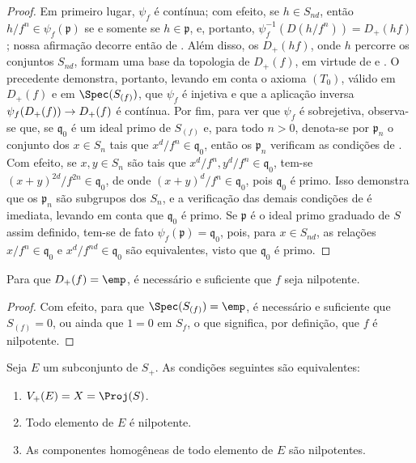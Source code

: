 \documentclass[oneside,10pt]{amsart}
\makeatletter
\newcommand{\ega@arrow}[2]{\mathchoice{#1}{#2}{#2}{#2}}
\renewcommand{\to}{\ega@arrow{\longrightarrow}{\rightarrow}}
\newcommand{\oldpage}[2][]{\marginnote{\normalfont\footnotesize\textbf{#1}~|~#2}\ignorespaces}
\let\EGAOriginalLabel\label
\renewcommand{\label}[1]{\phantomsection\EGAOriginalLabel{#1}}
\makeatother
\begin{document}
\begin{proof}
Em primeiro lugar, $\psi_f$ é contínua; com efeito, se $h\in S_{nd}$, então $h/f^n\in\psi_f(\mathfrak{p})$ se e somente se $h\in\mathfrak{p}$, e, portanto, $\psi_f^{-1}(D(h/f^n))=D_+(hf)$; nossa afirmação decorre então de .
Além disso, os $D_+(hf)$, onde $h$ percorre os conjuntos $S_{nd}$, formam uma base da topologia de $D_+(f)$, em virtude de  e .
O
\oldpage[II]{27}
precedente demonstra, portanto, levando em conta o axioma $(T_0)$, válido em $D_+(f)$ e em $\Spec(S_{(f)})$, que $\psi_f$ é injetiva e que a aplicação inversa $\psi_f(D_+(f))\to D_+(f)$ é contínua.
Por fim, para ver que $\psi_f$ é sobrejetiva, observa-se que, se $\mathfrak{q}_0$ é um ideal primo de $S_{(f)}$ e, para todo $n>0$, denota-se por $\mathfrak{p}_n$ o conjunto dos $x\in S_n$ tais que $x^d/f^n\in\mathfrak{q}_0$, então os $\mathfrak{p}_n$ verificam as condições de .
Com efeito, se $x,y\in S_n$ são tais que $x^d/f^n,y^d/f^n\in\mathfrak{q}_0$, tem-se $(x+y)^{2d}/f^{2n}\in\mathfrak{q}_0$, de onde $(x+y)^d/f^n\in\mathfrak{q}_0$, pois $\mathfrak{q}_0$ é primo.
Isso demonstra que os $\mathfrak{p}_n$ são subgrupos dos $S_n$, e a verificação das demais condições de  é imediata, levando em conta que $\mathfrak{q}_0$ é primo.
Se $\mathfrak{p}$ é o ideal primo graduado de $S$ assim definido, tem-se de fato $\psi_f(\mathfrak{p})=\mathfrak{q}_0$, pois, para $x\in S_{nd}$, as relações $x/f^n\in\mathfrak{q}_0$ e $x^d/f^{nd}\in\mathfrak{q}_0$ são equivalentes, visto que $\mathfrak{q}_0$ é primo.
\end{proof}

\begin{corollary}[2.3.7]
\label{II.2.3.7}
Para que $D_+(f)=\emp$, é necessário e suficiente que $f$ seja nilpotente.
\end{corollary}

\begin{proof}
Com efeito, para que $\Spec(S_{(f)})=\emp$, é necessário e suficiente que $S_{(f)}=0$, ou ainda que $1=0$ em $S_f$, o que significa, por definição, que $f$ é nilpotente.
\end{proof}

\begin{corollary}[2.3.8]
\label{II.2.3.8}
Seja $E$ um subconjunto de $S_+$.
As condições seguintes são equivalentes:
\begin{enumerate}
  \item[\rm(a)] $V_+(E)=X=\Proj(S)$.
  \item[\rm(b)] Todo elemento de $E$ é nilpotente.
  \item[\rm(c)] As componentes homogêneas de todo elemento de $E$ são nilpotentes.
\end{enumerate}
\end{corollary}
\end{document}
